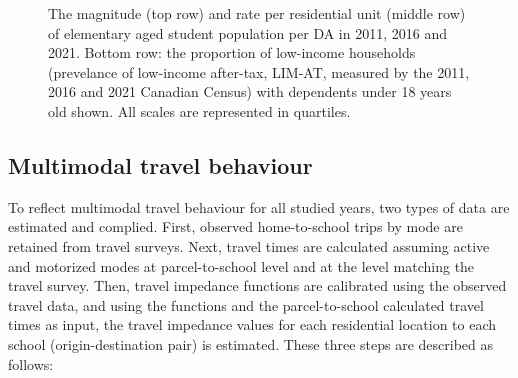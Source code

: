 \documentclass[
default
]{sn-jnl}
\begin{document}
\begin{figure}[H]


\caption{\label{fig-Fig3}The magnitude (top row) and rate per
residential unit (middle row) of elementary aged student population per
DA in 2011, 2016 and 2021. Bottom row: the proportion of low-income
households (prevelance of low-income after-tax, LIM-AT, measured by the
2011, 2016 and 2021 Canadian Census) with dependents under 18 years old
shown. All scales are represented in quartiles.}

\end{figure}%

\subsection{Multimodal travel
behaviour}\label{multimodal-travel-behaviour}

To reflect multimodal travel behaviour for all studied years, two types
of data are estimated and complied. First, observed home-to-school trips
by mode are retained from travel surveys. Next, travel times are
calculated assuming active and motorized modes at parcel-to-school level
and at the level matching the travel survey. Then, travel impedance
functions are calibrated using the observed travel data, and using the
functions and the parcel-to-school calculated travel times as input, the
travel impedance values for each residential location to each school
(origin-destination pair) is estimated. These three steps are described
as follows:
\end{document}
